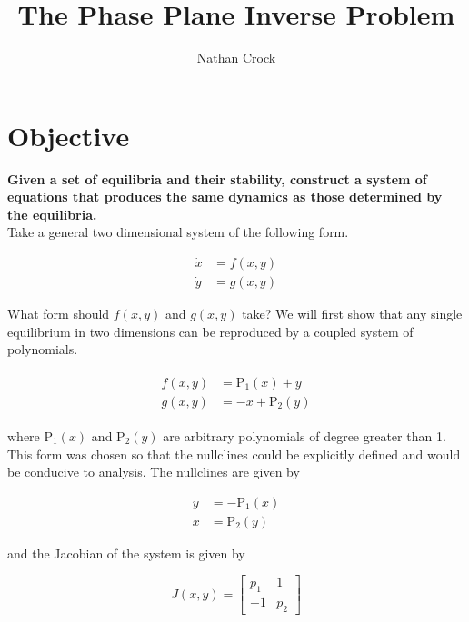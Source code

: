 \documentclass{article}
\title{The Phase Plane Inverse Problem}
\author{Nathan Crock}
\begin{document}
    
    
    \maketitle
    
    

    
    \section{Objective}\label{objective}

\textbf{Given a set of equilibria and their stability, construct a
system of equations that produces the same dynamics as those determined
by the equilibria.} \\

Take a general two dimensional system of the following form.

\begin{align*}
\dot x &= f(x,y) \\
\dot y &= g(x,y)
\end{align*}

\noindent What form should $f(x,y)$ and $g(x,y)$ take? We will first show that any
single equilibrium in two dimensions can be reproduced by a coupled system of
polynomials.

\begin{align}
    \begin{split}
    f(x,y) &= \text{P}_1(x)+y \\
    g(x,y) &= -x+\text{P}_2(y) \label{eq:system}
    \end{split}
\end{align}

\noindent where P$_1(x)$ and P$_2(y)$ are arbitrary polynomials of degree greater than 1.
This form was chosen so that the nullclines could be explicitly defined
and would be conducive to analysis. The nullclines are given by

\begin{align}
    y &= -\text{P}_1(x) \label{eq:x-null}\\ 
    x &= \text{P}_2(y) \label{eq:y-null}
\end{align}

\noindent and the Jacobian of the system is given by

\begin{equation}
J(x,y) = \begin{bmatrix}
       p_1 & 1 \\
       -1 & p_2
\end{bmatrix} \label{eq:jacobian}
 \end{equation}
\end{document}

